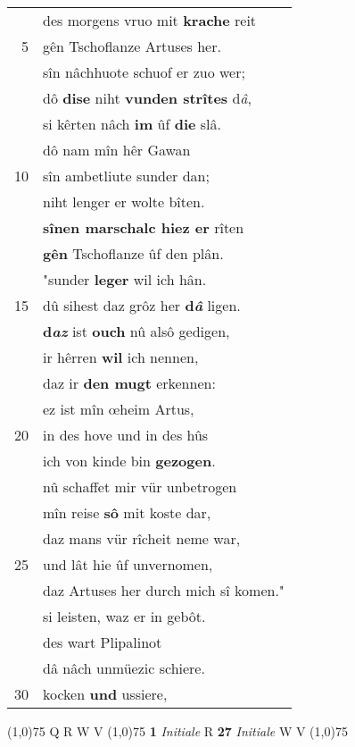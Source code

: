 \documentclass[8pt,a4paper,notitlepage]{article}
\begin{document}
\begin{table}[ht]
\begin{minipage}[t]{0.5\linewidth}
\begin{tabular}{rl}
 & des morgens vruo mit \textbf{krache} reit\\ 
5 & gên Tschoflanze Artuses her.\\ 
 & sîn nâchhuote schuof er zuo wer;\\ 
 & dô \textbf{dise} niht \textbf{vunden strîtes} d\textit{â},\\ 
 & si kêrten nâch \textbf{im} ûf \textbf{die} slâ.\\ 
 & dô nam mîn hêr Gawan\\ 
10 & sîn ambetliute sunder dan;\\ 
 & niht lenger er wolte bîten.\\ 
 & \textbf{sînen marschalc hiez er} rîten\\ 
 & \textbf{gên} Tschoflanze ûf den plân.\\ 
 & "sunder \textbf{leger} wil ich hân.\\ 
15 & dû sihest daz grôz her \textbf{d\textit{â}} ligen.\\ 
 & \textbf{d\textit{az}} ist \textbf{ouch} nû alsô gedigen,\\ 
 & ir hêrren \textbf{wil} ich nennen,\\ 
 & daz ir \textbf{den mugt} erkennen:\\ 
 & ez ist mîn œheim Artus,\\ 
20 & in des hove und in des hûs\\ 
 & ich von kinde bin \textbf{gezogen}.\\ 
 & nû schaffet mir vür unbetrogen\\ 
 & mîn reise \textbf{sô} mit koste dar,\\ 
 & daz mans vür rîcheit neme war,\\ 
25 & und lât hie ûf unvernomen,\\ 
 & daz Artuses her durch mich sî komen."\\ 
 & si leisten, waz er in gebôt.\\ 
 & des wart Plipalinot\\ 
 & dâ nâch unmüezic schiere.\\ 
30 & kocken \textbf{und} ussiere,\\ 
\end{tabular}
\scriptsize
\line(1,0){75} \newline
Q R W V \newline
\line(1,0){75} \newline
\textbf{1} \textit{Initiale} R  \textbf{27} \textit{Initiale} W V  \newline
\line(1,0){75} \newline

\end{minipage}
\end{table}
\end{document}
